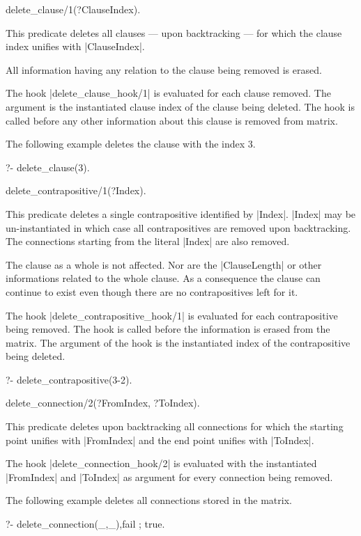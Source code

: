 \Predicate delete_clause/1(?ClauseIndex).

This predicate deletes all clauses --- upon backtracking --- for which the
clause index unifies with |ClauseIndex|.

All information having any relation to the clause being removed is erased.

The hook |delete_clause_hook/1| is evaluated for each clause removed. The
argument is the instantiated clause index of the clause being deleted. The
hook is called before any other information about this clause is removed from
matrix. 

The following example deletes the clause with the index 3.
\begin{BoxedSample}
  ?- delete\_clause(3).
\end{BoxedSample}

\Predicate delete_contrapositive/1(?Index).

This predicate deletes a single contrapositive identified by |Index|. |Index|
may be un-instantiated in which case all contrapositives are removed upon
backtracking. The connections starting from the literal |Index| are also
removed.

The clause as a whole is not affected. Nor are the |ClauseLength| or other
informations related to the whole clause. As a consequence the clause can
continue to exist even though there are no contrapositives left for it.

The hook |delete_contrapositive_hook/1| is evaluated for each contrapositive
being removed. The hook is called before the information is erased from the
matrix. The argument of the hook is the instantiated index of the
contrapositive being deleted.

\begin{BoxedSample}
  ?- delete\_contrapositive(3-2).
\end{BoxedSample}

\Predicate delete_connection/2(?FromIndex, ?ToIndex).

This predicate deletes upon backtracking all connections for which the
starting point unifies with |FromIndex| and the end point unifies with
|ToIndex|. 

The hook |delete_connection_hook/2| is evaluated with the instantiated
|FromIndex| and |ToIndex| as argument for every connection being removed.

The following example deletes all connections stored in the matrix.
\begin{BoxedSample}
  ?- delete\_connection(\_,\_),fail ; true.
\end{BoxedSample}


